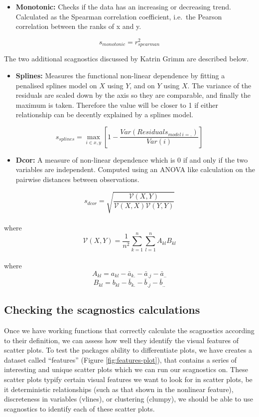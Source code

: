 \begin{itemize}
\tightlist
\item
  \textbf{Monotonic:} Checks if the data has an increasing or decreasing
  trend. Calculated as the Spearman correlation coefficient, i.e.~the
  Pearson correlation between the ranks of x and y.
\end{itemize}

\[s_{monotonic} = r^2_{spearman}\]

The two additional scagnostics discussed by Katrin Grimm are described
below.

\begin{itemize}
\tightlist
\item
  \textbf{Splines:} Measures the functional non-linear dependence by
  fitting a penalised splines model on \(X\) using \(Y\), and on \(Y\)
  using \(X\). The variance of the residuals are scaled down by the axis
  so they are comparable, and finally the maximum is taken. Therefore
  the value will be closer to 1 if either relationship can be decently
  explained by a splines model.
\end{itemize}

\[s_{splines}=\max_{i\in x,y}[1-\frac{Var(Residuals_{model~i=.})}{Var(i)}]\]

\begin{itemize}
\tightlist
\item
  \textbf{Dcor:} A measure of non-linear dependence which is 0 if and
  only if the two variables are independent. Computed using an ANOVA
  like calculation on the pairwise distances between observations.
\end{itemize}

\[s_{dcor}= \sqrt{\frac{\mathcal{V}(X,Y)}{\mathcal{V}(X,X)\mathcal{V}(Y,Y)}}\]\\
where \[\mathcal{V}
(X,Y)=\frac{1}{n^2}\sum_{k=1}^n\sum_{l=1}^nA_{kl}B_{kl}\]\\
where \[A_{kl}=a_{kl}-\bar{a}_{k.}-\bar{a}_{.j}-\bar{a}_{..}\]
\[B_{kl}=b_{kl}-\bar{b}_{k.}-\bar{b}_{.j}-\bar{b}_{..}\]

\hypertarget{checking-the-scagnostics-calculations}{%
\subsection{Checking the scagnostics
calculations}\label{checking-the-scagnostics-calculations}}

Once we have working functions that correctly calculate the scagnostics
according to their definition, we can assess how well they identify the
visual features of scatter plots. To test the packages ability to
differentiate plots, we have creates a dataset called ``features''
(Figure \ref{fig:features-plot}), that contains a series of interesting
and unique scatter plots which we can run our scagnostics on. These
scatter plots typify certain visual features we want to look for in
scatter plots, be it deterministic relationships (such as that shown in
the nonlinear feature), discreteness in variables (vlines), or
clustering (clumpy), we should be able to use scagnostics to identify
each of these scatter plots.

